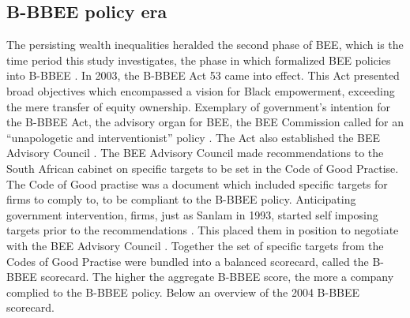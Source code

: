 \subsection{B-BBEE policy era}
The persisting wealth inequalities heralded the second phase of BEE, which is the time period this study investigates, the phase in which formalized BEE policies into B-BBEE \cite[p7]{N23}. In 2003, the B-BBEE Act 53 came into effect. This Act presented broad objectives which encompassed a vision for Black empowerment, exceeding the mere transfer of equity ownership. Exemplary of government’s intention for the B-BBEE Act, the advisory organ for BEE, the BEE Commission called for an “unapologetic and interventionist” policy \cite[p168]{N30}. The Act also established the BEE Advisory Council \cite[p7]{N37}. The BEE Advisory Council made recommendations to the South African cabinet on specific targets to be set in the Code of Good Practise. The Code of Good practise was a document which included specific targets for firms to comply to, to be compliant to the B-BBEE policy. Anticipating government intervention, firms, just as Sanlam in 1993, started self imposing targets prior to the recommendations \cite[p9]{N23} . This placed them in position to negotiate with the BEE Advisory Council \cite[p9]{N23}. Together the set of specific targets from the Codes of Good Practise were bundled into a balanced scorecard, called the B-BBEE scorecard. The higher the aggregate B-BBEE score, the more a company complied to the B-BBEE policy. Below an overview of the 2004 B-BBEE scorecard.

